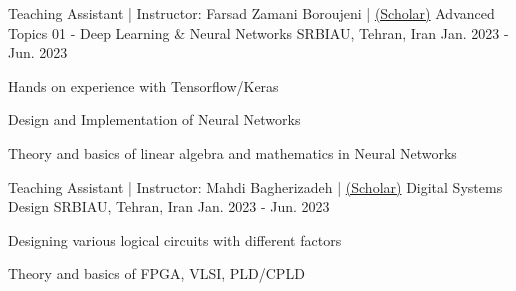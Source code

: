 


\begin{cventries}


\cventry
{Teaching Assistant | Instructor: Farsad Zamani Boroujeni | \href{https://scholar.google.com/citations?user=RENIRWwAAAAJ&hl=en}{(Scholar)}} %
{Advanced Topics 01 - Deep Learning \& Neural Networks} %
{SRBIAU, Tehran, Iran} %
{Jan. 2023 - Jun. 2023} %
{ %
\begin{cvitems}
\item {\vspace{-4.0mm}\fontsize{10}{11}\selectfont Hands on experience with Tensorflow/Keras}
\item {\fontsize{10}{11}\selectfont Design and Implementation of Neural Networks}
\item {\fontsize{10}{11}\selectfont Theory and basics of linear algebra and mathematics in Neural Networks}
\end{cvitems}
}


\cventry
{Teaching Assistant | Instructor: Mahdi Bagherizadeh | \href{https://scholar.google.com/citations?user=mvHPeQwAAAAJ&hl=en}{(Scholar)}} %
{Digital Systems Design} %
{SRBIAU, Tehran, Iran} %
{Jan. 2023 - Jun. 2023} %
{ %
\begin{cvitems}
\item {\vspace{-4.0mm}\fontsize{10}{11}\selectfont Designing various logical circuits with different factors}
\item {\fontsize{10}{11}\selectfont Theory and basics of FPGA, VLSI, PLD/CPLD}
\end{cvitems}
}


\end{cventries}
